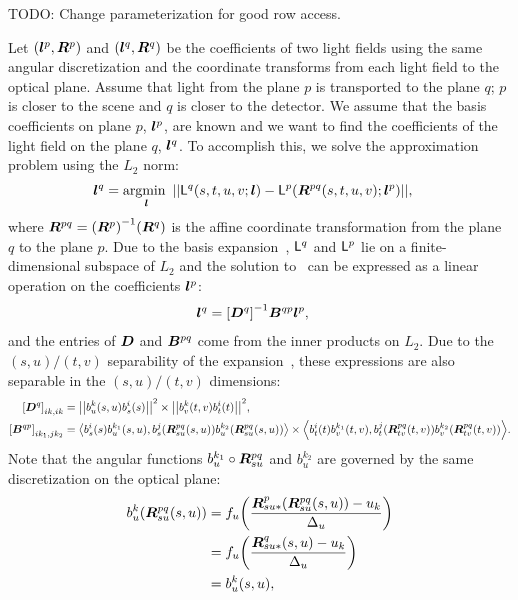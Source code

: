TODO: Change parameterization for good row access.

Let $ {\left( {\bm{l}}^p, {\bm{R}}^p \right)}$ and $ {\left( {\bm{l}}^q, {\bm{R}}^q \right)}$ be the coefficients of two
light fields using the same angular discretization and the coordinate
transforms from each light field to the optical plane.  Assume that light
from the plane $p$ is transported to the plane $q$; \ie{} $p$ is closer to the
scene and $q$ is closer to the detector.  We assume that the basis coefficients
on plane $p$, ${\bm{l}}^p$, are known and we want to find the coefficients of the
light field on the plane $q$, ${\bm{l}}^q$.  To accomplish this, we solve the 
approximation problem using the $L_2$ norm:
\begin{align}
    \bl^q 
    &=
    \argmin_{\bl}
    \GN{%
        \LF^q\GP{s,t,u,v; \bl}
        -
        \LF^p\GP{\bR^{pq}\GP{s,t,u,v}; \bl^p}
    },
    \label{eqn,xport}
\end{align}
where ${\bm{R}}^{pq} =  {\left( {\bm{R}}^p \right)}^{-1} {\left( {\bm{R}}^q \right)}$ is the affine coordinate
transformation from the plane $q$ to the plane $p$.  Due to the basis 
expansion~, $\mathsf{L}^q$ and $\mathsf{L}^p$ lie on a finite-dimensional
subspace of $L_2$ and the solution to~ can be expressed as a 
linear operation on the coefficients ${\bm{l}}^p$:
\begin{align}
    {\ensuremath{\bm{l}}}^q
    &=
     {\left[ {\bm{D}}^q \right] }^{-1} {\bm{B}}^{qp} {\bm{l}}^p,
\end{align}
and the entries of ${\bm{D}}$ and ${\bm{B}}^{pq}$ come from the inner products on
$L_2$.  Due to the $(s,u)/(t,v)$ separability of the 
expansion~, these expressions are also separable in the
$(s,u)/(t,v)$ dimensions:
\begin{align}
    \GB{\bD^q}_{ik, ik}
    &=
    \GN{%
        b^k_u\GP{s,u} b^i_s\GP{s}
    }^2
    \times
    \GN{%
        b^k_v\GP{t,v} b^i_t\GP{t}
    }^2,
    \nonumber \\
    \GB{\bB^{qp}}_{ik_1, jk_2}
    &=
    \GA{%
        b^i_s\GP{s} b^{k_1}_u\GP{s,u}, 
        b^j_s\GP{\bR^{pq}_{su}\GP{s,u}} b^{k_2}_u\GP{\bR^{pq}_{su}\GP{s,u}}
    }
    \times
    \GA{%
        b^i_t\GP{t} b^{k_1}_v\GP{t,v},
        b^j_t\GP{\bR^{pq}_{tv}\GP{t,v}} b^{k_2}_v\GP{\bR^{pq}_{tv}\GP{t,v}} 
    }.
    \label{eqn,iprod}
\end{align}
Note that the angular functions $b^{k_1}_u \circ {\ensuremath{\bm{R}}}^{pq}_{su}$ and $b^{k_2}_u$
are governed by the same discretization on the optical plane:
\begin{align}
    b^{k}_u {\left( {\bm{R}}^{pq}_{su} {\left( s,u \right)} \right)}
    &=
    f_u {\left( \frac{{\bm{R}}^p_{su*} {\left( {\bm{R}}^{pq}_{su} {\left( s,u \right)} \right)} - u_{k}}{\Delta_u} \right)} 
    \nonumber \\
    &=
    f_u {\left( \frac{{\bm{R}}^{q}_{su*} {\left( s,u \right)} - u_{k}}{\Delta_u} \right)} 
    \nonumber \\
    &=
    b^{k}_u {\left( s,u \right)},
    \label{eqn,same,angle}
\end{align}
